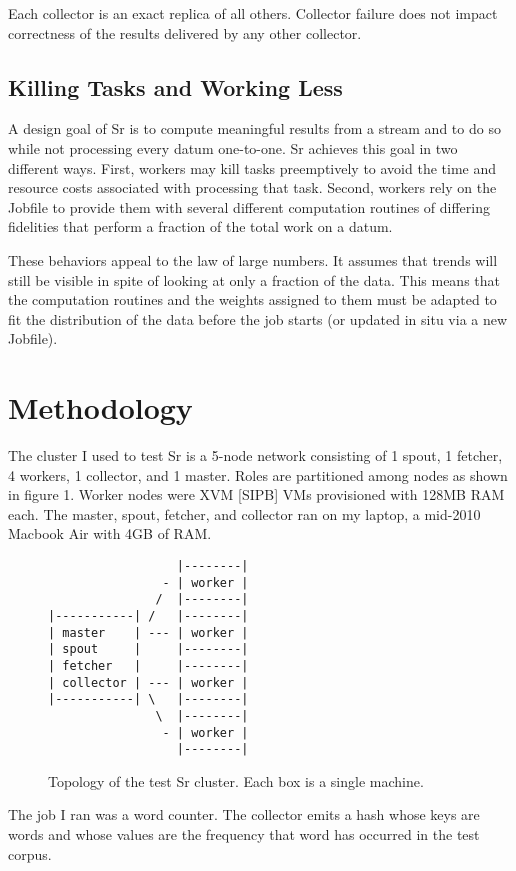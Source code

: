 \documentclass[12pt]{article}
\begin{document}
Each collector is an exact replica of all others. Collector failure does not impact correctness of the results delivered by any other collector.
\subsection{Killing Tasks and Working Less}
A design goal of Sr is to compute meaningful results from a stream and to do so while not processing every datum one-to-one. Sr achieves this goal in two different ways. First, workers may kill tasks preemptively to avoid the time and resource costs associated with processing that task. Second, workers rely on the Jobfile to provide them with several different computation routines of differing fidelities that perform a fraction of the total work on a datum.

These behaviors appeal to the law of large numbers. It assumes that trends will still be visible in spite of looking at only a fraction of the data. This means that the computation routines and the weights assigned to them must be adapted to fit the distribution of the data before the job starts (or updated in situ via a new Jobfile).

\section{Methodology}
The cluster I used to test Sr is a 5-node network consisting of 1 spout, 1 fetcher, 4 workers, 1 collector, and 1 master. Roles are partitioned among nodes as shown in figure 1. Worker nodes were XVM [SIPB] VMs provisioned with 128MB RAM each. The master, spout, fetcher, and collector ran on my laptop, a mid-2010 Macbook Air with 4GB of RAM.

\begin{figure}
\begin{verbatim}
                  |--------|
                - | worker | 
               /  |--------|
|-----------| /   |--------|
| master    | --- | worker |
| spout     |     |--------|
| fetcher   |     |--------|
| collector | --- | worker |
|-----------| \   |--------|
               \  |--------|
                - | worker |
                  |--------|

\end{verbatim}
\caption{Topology of the test Sr cluster. Each box is a single machine.}
\end{figure}

The job I ran was a word counter. The collector emits a hash whose keys are words and whose values are the frequency that word has occurred in the test corpus.
\end{document}
